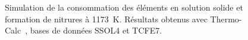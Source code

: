 \begin{figure}[h]
  \centering
  \hfill{}

  \caption{\label{fig:consommation_matrice}Simulation de la consommation des éléments en solution solide et formation de nitrures à \SI{1173}{\kelvin}. Résultats obtenus avec Thermo-Calc~\cite{Andersson2002,Borgenstam2000}, bases de données SSOL4 et TCFE7.}
\end{figure}


